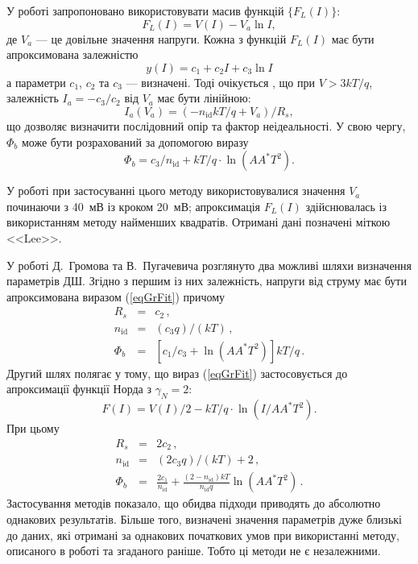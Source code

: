 У роботі \cite{Lee} запропоновано використовувати масив функцій $\{F_L(I)\}$:
\begin{equation}
\label{eqLee}
F_L(I)=V(I)-V_a\ln I,
\end{equation}
де
$V_a$ --- це довільне значення напруги.
Кожна з функцій $F_L(I)$ має бути апроксимована залежністю
\begin{equation}
\label{eqGrFit}
y(I)=c_1+c_2I+c_3\ln I
\end{equation}
а параметри $c_1$, $c_2$ та $c_3$ --- визначені.
Тоді очікується \cite{Lee}, що при $V>3kT/q$,
залежність $I_a=-c_3/c_2$ від $V_a$ має бути лінійною:
\begin{equation}
\label{eqLeeDet}
I_a(V_a)=(-n_\mathrm{id}kT/q+V_a)/R_s,
\end{equation}
що дозволяє визначити послідовний опір та фактор неідеальності.
У свою чергу, $\Phi_b$ може бути розрахований \cite{Lee} за допомогою виразу
\begin{equation}
\label{eqLeeFb}
\Phi_b=c_3/n_\mathrm{id}+kT/q\cdot\ln\left(AA^*T^2\right).
\end{equation}

У роботі при застосуванні цього методу використовувалися значення $V_a$ починаючи з 40~мВ із кроком 20~мВ;
апроксимація $F_L(I)$ здійснювалась із використанням методу найменших квадратів.
Отримані дані позначені міткою <<Lee>>.

У роботі Д.~Громова та В.~Пугачевича \cite{Gromov} розглянуто два можливі шляхи визначення параметрів ДШ.
Згідно з першим із них залежність, напруги від струму має бути апроксимована виразом (\ref{eqGrFit}) причому
\begin{eqnarray}
\label{eqGr1}
R_s&=&c_2\,,
\\
n_\mathrm{id}&=&(c_3q)/(kT)\,,
\\
\Phi_b&=&\left[c_1/c_3+\ln\left(AA^*T^2\right)\right]kT/q\,.
\end{eqnarray}
Другий шлях полягає у тому, що вираз (\ref{eqGrFit}) застосовується до апроксимації функції Норда з $\gamma_N=2$:
\begin{equation}
\label{eqGr2}
F(I)=V(I)/2-kT/q\cdot\ln(I/AA^*T^2).
\end{equation}
При цьому \cite{Gromov}
\begin{eqnarray}
\label{eqGr2Det}
R_s&=&2c_2\,,
\\
n_\mathrm{id}&=&(2c_3q)/(kT)+2\,,
\\
\Phi_b&=&\frac{2c_1}{n_\mathrm{id}}+\frac{(2-n_\mathrm{id})kT}{n_\mathrm{id}q}\ln\left(AA^*T^2\right)\,.
\end{eqnarray}
Застосування методів показало, що обидва підходи приводять до абсолютно однакових результатів.
Більше того, визначені значення параметрів дуже близькі до даних, які отримані за однакових початкових умов при використанні методу, описаного в роботі \cite{Lee} та згаданого раніше.
Тобто ці методи не є незалежними.

